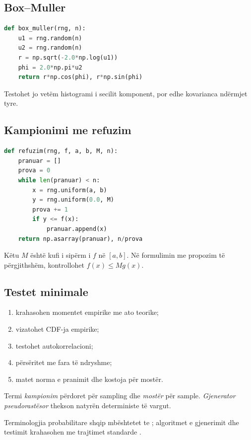 \documentclass[11pt,oneside,openany]{book}
\begin{document}
\subsection{Box--Muller}
\begin{lstlisting}[language=Python,caption={Gjenerimi i çifteve Gauss standarde.}]
def box_muller(rng, n):
    u1 = rng.random(n)
    u2 = rng.random(n)
    r = np.sqrt(-2.0*np.log(u1))
    phi = 2.0*np.pi*u2
    return r*np.cos(phi), r*np.sin(phi)
\end{lstlisting}
Testohet jo vetëm histogrami i secilit komponent, por edhe kovarianca ndërmjet tyre.

\subsection{Kampionimi me refuzim}
\begin{lstlisting}[language=Python,caption={Refuzimi për një dendësi në interval të fundmë.}]
def refuzim(rng, f, a, b, M, n):
    pranuar = []
    prova = 0
    while len(pranuar) < n:
        x = rng.uniform(a, b)
        y = rng.uniform(0.0, M)
        prova += 1
        if y <= f(x):
            pranuar.append(x)
    return np.asarray(pranuar), n/prova
\end{lstlisting}
Këtu $M$ është kufi i sipërm i $f$ në $[a,b]$. Në formulimin me propozim të përgjithshëm, kontrollohet $f(x)\le M g(x)$.

\subsection{Testet minimale}
\begin{enumerate}
\item krahasohen momentet empirike me ato teorike;
\item vizatohet CDF-ja empirike;
\item testohet autokorrelacioni;
\item përsëritet me fara të ndryshme;
\item matet norma e pranimit dhe kostoja për mostër.
\end{enumerate}
Termi \emph{kampionim} përdoret për sampling dhe \emph{mostër} për sample. \emph{Gjenerator pseudorastësor} thekson natyrën deterministe të vargut.

Terminologjia probabilitare shqip mbështetet te \cite{capollari,butka,tasho}; algoritmet e gjenerimit dhe testimit krahasohen me trajtimet standarde \cite{press,robert}.

\end{document}
